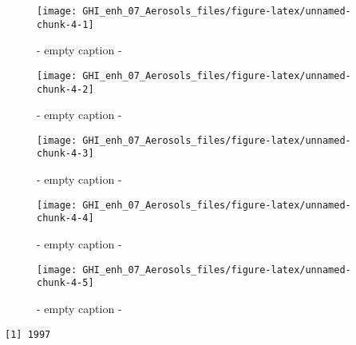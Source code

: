 \documentclass[
  10pt,
  a4paper,oneside]{article}
\begin{document}
\begin{figure}[H]

{\centering \texttt{[image: GHI\_enh\_07\_Aerosols\_files/figure-latex/unnamed-chunk-4-1]} 

}

\caption{ - empty caption - }\label{fig:unnamed-chunk-4-1}
\end{figure}
\begin{figure}[H]

{\centering \texttt{[image: GHI\_enh\_07\_Aerosols\_files/figure-latex/unnamed-chunk-4-2]} 

}

\caption{ - empty caption - }\label{fig:unnamed-chunk-4-2}
\end{figure}
\begin{figure}[H]

{\centering \texttt{[image: GHI\_enh\_07\_Aerosols\_files/figure-latex/unnamed-chunk-4-3]} 

}

\caption{ - empty caption - }\label{fig:unnamed-chunk-4-3}
\end{figure}
\begin{figure}[H]

{\centering \texttt{[image: GHI\_enh\_07\_Aerosols\_files/figure-latex/unnamed-chunk-4-4]} 

}

\caption{ - empty caption - }\label{fig:unnamed-chunk-4-4}
\end{figure}
\begin{figure}[H]

{\centering \texttt{[image: GHI\_enh\_07\_Aerosols\_files/figure-latex/unnamed-chunk-4-5]} 

}

\caption{ - empty caption - }\label{fig:unnamed-chunk-4-5}
\end{figure}

\begin{verbatim}
[1] 1997
\end{verbatim}
\end{document}
